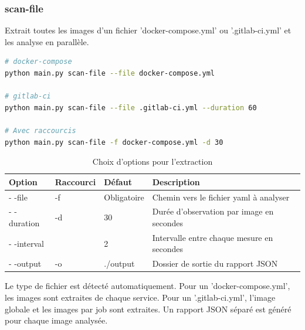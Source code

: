 \subsubsection{scan-file}
Extrait toutes les images d'un fichier 'docker-compose.yml' ou '.gitlab-ci.yml' et les analyse en parallèle. \\
\begin{lstlisting}[language=bash, caption=commande extraction images]
# docker-compose
python main.py scan-file --file docker-compose.yml

# gitlab-ci
python main.py scan-file --file .gitlab-ci.yml --duration 60

# Avec raccourcis
python main.py scan-file -f docker-compose.yml -d 30
\end{lstlisting}
\begin{table}[H]
    \centering
    \begin{tabularx}{\textwidth}{|l|l|l|X|}
        \hline
        \textbf{Option} & \textbf{Raccourci} & \textbf{Défaut} & \textbf{Description} \\
        \hline
        - -file & -f & Obligatoire & Chemin vers le fichier yaml à analyser \\
        \hline
        - -duration & -d & 30 & Durée d'observation par image en secondes \\
        \hline
        - -interval &  & 2 & Intervalle entre chaque mesure en secondes \\
        \hline
        - -output & -o & ./output & Dossier de sortie du rapport JSON \\
        \hline
    \end{tabularx}
    \caption{Choix d'options pour l'extraction}
\end{table}
Le type de fichier est détecté automatiquement. Pour un 'docker-compose.yml', les images sont extraites de chaque service. Pour un '.gitlab-ci.yml', l'image globale et les images par job sont extraites. Un rapport JSON séparé est généré pour chaque image analysée. \\
